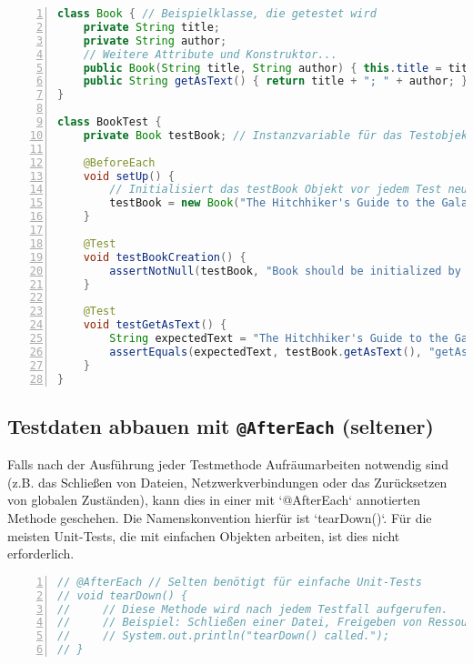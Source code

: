 \begin{lstlisting}[language=Java, caption={Verwendung von \texttt{@BeforeEach} zur Initialisierung}, label=lst:junit_beforeeach_example, basicstyle=\ttfamily\footnotesize, breaklines=true, frame=tb, numbers=left]
class Book { // Beispielklasse, die getestet wird
    private String title;
    private String author;
    // Weitere Attribute und Konstruktor...
    public Book(String title, String author) { this.title = title; this.author = author; }
    public String getAsText() { return title + "; " + author; }
}

class BookTest {
    private Book testBook; // Instanzvariable für das Testobjekt

    @BeforeEach
    void setUp() {
        // Initialisiert das testBook Objekt vor jedem Test neu
        testBook = new Book("The Hitchhiker's Guide to the Galaxy", "Douglas Adams");
    }

    @Test
    void testBookCreation() {
        assertNotNull(testBook, "Book should be initialized by setUp()");
    }

    @Test
    void testGetAsText() {
        String expectedText = "The Hitchhiker's Guide to the Galaxy; Douglas Adams";
        assertEquals(expectedText, testBook.getAsText(), "getAsText() should return correct format.");
    }
}
\end{lstlisting}

\subsection{Testdaten abbauen mit \texttt{@AfterEach} (seltener)}
\label{ssec:junit_aftereach}
Falls nach der Ausführung jeder Testmethode Aufräumarbeiten notwendig sind (z.B. das Schließen von Dateien, Netzwerkverbindungen oder das Zurücksetzen von globalen Zuständen), kann dies in einer mit `@AfterEach` annotierten Methode geschehen. Die Namenskonvention hierfür ist `tearDown()`. Für die meisten Unit-Tests, die mit einfachen Objekten arbeiten, ist dies nicht erforderlich.

\begin{lstlisting}[language=Java, caption={Verwendung von \texttt{@AfterEach} für Aufräumarbeiten}, label=lst:junit_aftereach_example, basicstyle=\ttfamily\footnotesize, breaklines=true, frame=tb, numbers=left]
// @AfterEach // Selten benötigt für einfache Unit-Tests
// void tearDown() {
//     // Diese Methode wird nach jedem Testfall aufgerufen.
//     // Beispiel: Schließen einer Datei, Freigeben von Ressourcen.
//     // System.out.println("tearDown() called.");
// }
\end{lstlisting}

